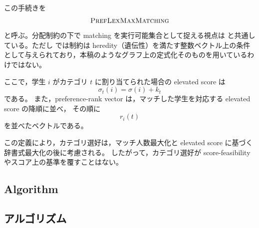 \documentclass[
  12pt,
  a4paper,
  oneside,
  onecolumn,
  titlepage,
  final
]{jsarticle}
\newcommand{\1}{\mathbf{1}}
\begin{document}
この手続きを
\[
    \textsc{PrefLexMaxMatching}
\]
と呼ぶ。分配制約の下で matching を実行可能集合として捉える視点は \citet{GKK+17a} と共通している。ただし \citet{GKK+17a} では制約は heredity（遺伝性）を満たす整数ベクトル上の条件として与えられており，本稿のようなグラフ上の定式化そのものを用いているわけではない。

ここで，学生 $i$ がカテゴリ $t$ に割り当てられた場合の elevated score は
\[
    \sigma_t(i)=\sigma(i)+k_t
\]
である。
また，preference-rank vector は，マッチした学生を対応する elevated score の降順に並べ，
その順に
\[
    r_i(t)
\]
を並べたベクトルである。

この定義により，カテゴリ選好は，マッチ人数最大化と elevated score に基づく
辞書式最大化の後に考慮される。
したがって，カテゴリ選好が score-feasibility やスコア上の基準を覆すことはない。

\subsection{Algorithm}
\subsection{アルゴリズム}
\end{document}

